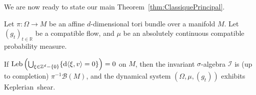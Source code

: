 \documentclass[AHL,Unicode,longabstracts]{cedram}
\DeclareMathOperator{\Leb}{Leb}
\newcommand{\Z}{\mathbb{Z}}
\newcommand{\R}{\mathbb{R}}
\newcommand{\Bcal}{\mathcal{B}}
\newcommand{\Ical}{\mathcal{I}}
\newcommand{\de}{{\rm d}}
\begin{document}
We are now ready to state our main Theorem~\ref{thm:ClassiquePrincipal}.

\begin{theo}\label{thm:ClassiquePrincipal}

Let $\pi: \Omega \to M$ be an affine $d$-dimensional tori bundle over a manifold $M$. Let $(g_t)_{t \in \R}$ be a compatible flow, and $\mu$ be an absolutely continuous compatible probability measure.


If $\Leb \left(\bigcup_{\xi \in \Z^d - \{0\}} \{ \de \langle \xi, v \rangle = 0\}\right) = 0$ on $M$, then the invariant $\sigma$-algebra $\Ical$ is (up to completion) $\pi^{-1} \Bcal (M)$, and the dynamical system $(\Omega, \mu, (g_t))$ exhibits Keplerian~shear.
\end{theo}
\end{document}
